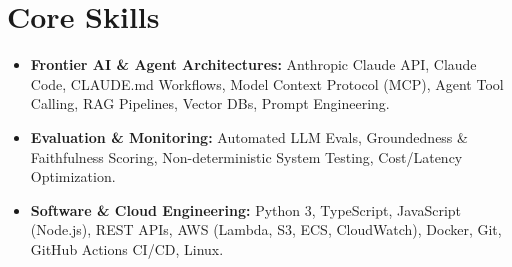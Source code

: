 \documentclass[a4paper,10pt]{article}
\begin{document}
\section{Core Skills}
\begin{itemize}
  \item \textbf{Frontier AI \& Agent Architectures:} Anthropic Claude API, Claude Code, CLAUDE.md Workflows, Model Context Protocol (MCP), Agent Tool Calling, RAG Pipelines, Vector DBs, Prompt Engineering.
  \item \textbf{Evaluation \& Monitoring:} Automated LLM Evals, Groundedness \& Faithfulness Scoring, Non-deterministic System Testing, Cost/Latency Optimization.
  \item \textbf{Software \& Cloud Engineering:} Python 3, TypeScript, JavaScript (Node.js), REST APIs, AWS (Lambda, S3, ECS, CloudWatch), Docker, Git, GitHub Actions CI/CD, Linux.
\end{itemize}
\end{document}
